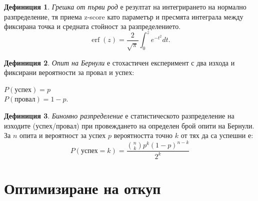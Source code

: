 \documentclass[11pt, a4paper]{article}
\theoremstyle{definition}
\newtheorem{definition}{Дефиниция}
\begin{document}
		\begin{definition}
			\label{def:err}
			\emph{Грешка от първи род} е резултат на интегрирането на нормално разпределение, тя приема z-score като параметър и пресмята интеграла между фиксирана точка и средната стойност за разпределението.
			$$\operatorname{erf}(z)=\dfrac{2}{\sqrt{\pi}}\int_{0}^{z}e^{-t^{2}}dt.$$
		\end{definition}
	
		\begin{definition}
			\label{def:Bernoulli_trial}
			\emph{Опит на Бернули} е стохастичен експеримент с два изхода и фиксирани вероятности за провал и успех:
			\begin{center}
				$P(\text{успех})=p$\\
				$P(\text{провал})=1-p.$
			\end{center}
		\end{definition}
		
		\begin{definition}
			\label{def:Binomial_distribution}
			\emph{Биномно разпределение} е статистическото разпределение на изходите (успех/провал) при провеждането на определен брой опити на Бернули.
			За $n$ опита и вероятност за успех $p$ вероятността точно $k$ от тях да са успешни е:
			$$
			P(\text{успех} = k) = \frac{\binom{n}{k}p^{k}(1-p)^{n-k}}{2^k}
			$$
		\end{definition}
		\newpage

	\section{Оптимизиране на откуп}		
\end{document}
